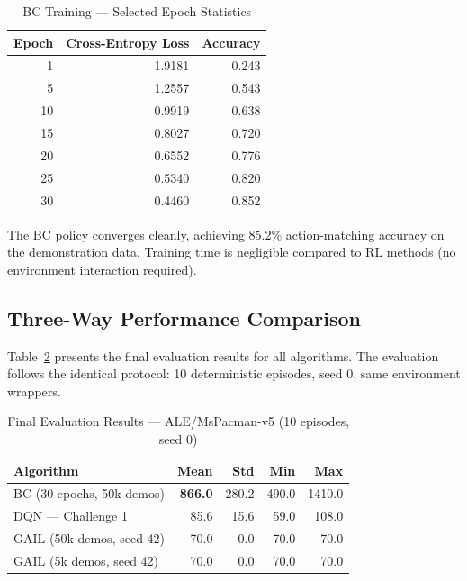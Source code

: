 \documentclass[conference]{IEEEtran}
\begin{document}
\begin{table}[h]
\centering
\caption{BC Training — Selected Epoch Statistics}
\label{tab:bc_training}
\begin{tabular}{rrr}
\toprule
\textbf{Epoch} & \textbf{Cross-Entropy Loss} & \textbf{Accuracy} \\
\midrule
 1  & 1.9181 & 0.243 \\
 5  & 1.2557 & 0.543 \\
10  & 0.9919 & 0.638 \\
15  & 0.8027 & 0.720 \\
20  & 0.6552 & 0.776 \\
25  & 0.5340 & 0.820 \\
30  & 0.4460 & 0.852 \\
\bottomrule
\end{tabular}
\end{table}

The BC policy converges cleanly, achieving 85.2\% action-matching accuracy on the
demonstration data.
Training time is negligible compared to RL methods (no environment interaction required).

\subsection{Three-Way Performance Comparison}

Table~\ref{tab:comparison} presents the final evaluation results for all algorithms.
The evaluation follows the identical protocol: 10 deterministic episodes, seed 0,
same environment wrappers.

\begin{table}[h]
\centering
\caption{Final Evaluation Results — ALE/MsPacman-v5 (10 episodes, seed 0)}
\label{tab:comparison}
\begin{tabular}{lrrrr}
\toprule
\textbf{Algorithm} & \textbf{Mean} & \textbf{Std} & \textbf{Min} & \textbf{Max} \\
\midrule
BC (30 epochs, 50k demos)  & \textbf{866.0} & 280.2 &  490.0 & 1410.0 \\
DQN — Challenge 1          &  85.6          &  15.6 &   59.0 &  108.0 \\
GAIL (50k demos, seed 42)  &  70.0          &   0.0 &   70.0 &   70.0 \\
GAIL (5k demos, seed 42)   &  70.0          &   0.0 &   70.0 &   70.0 \\
\bottomrule
\end{tabular}
\end{table}
\end{document}
